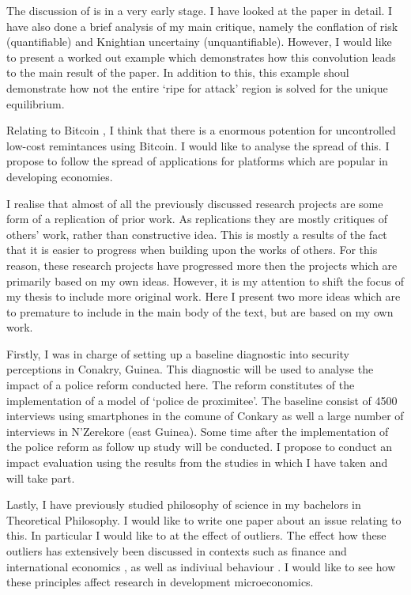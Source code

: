 \documentclass[a4paper]{report}\usepackage{graphicx, color}
\begin{document}
\begin{refsection}
The discussion of \textcite{morris1998unique} is in a very early stage. I have looked at the paper in detail. I have also done a brief analysis of my main critique, namely the conflation of risk (quantifiable) and Knightian uncertainy (unquantifiable). However, I would like to present a worked out example which demonstrates how this convolution leads to the main result of the paper. In addition to this, this example shoul demonstrate how not the entire `ripe for attack' region is solved for the unique equilibrium.

Relating to Bitcoin \parencite{nakamoto2008bitcoin}, I think that there is a enormous potention for uncontrolled low-cost remintances using Bitcoin. I would like to analyse the spread of this. I propose to follow the spread of applications for platforms which are popular in developing economies.

I realise that almost of all the previously discussed research projects are some form of a replication of prior work. As replications they are mostly critiques of others' work, rather than constructive idea. This is mostly a results of the fact that it is easier to progress when building upon the works of others. For this reason, these research projects have progressed more then the projects which are primarily based on my own ideas. However, it is my attention to shift the focus of my thesis to include more original work. Here I present two more ideas which are to premature to include in the main body of the text, but are based on my own work.

Firstly, I was in charge of setting up a baseline diagnostic into security perceptions in Conakry, Guinea. This diagnostic will be used to analyse the impact of a police reform conducted here. The reform constitutes of the implementation of a model of `police de proximitee'. The baseline consist of 4500 interviews using smartphones in the comune of Conkary as well a large number of interviews in N'Zerekore (east Guinea). Some time after the implementation of the police reform as follow up study will be conducted. I propose to conduct an impact evaluation using the results from the studies in which I have taken and will take part.

Lastly, I have previously studied philosophy of science in my bachelors in Theoretical Philosophy. I would like to write one paper about an issue relating to this. In particular I would like to at the effect of outliers. The effect how these outliers has extensively been discussed in contexts such as finance and international economics \parencite{taleb2010black,   sornette2009dragon},  as well as indiviual behaviour \parencite{kahneman2011thinking}. I would like to see how these principles affect research in development microeconomics.

\printbibliography
\end{refsection}
\end{document}

